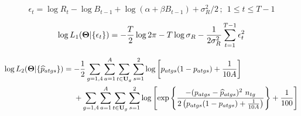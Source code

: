 \documentclass[11pt]{article}   %
\def\bfTh{{\bf \Theta}}          %
\def\beq{\vspace{-5ex} \begin{fleqn} \begin{equation}}   %
\def\eeq{\end{equation} \end{fleqn} \vspace{-5ex}}     %
\def\vsd{\vspace*{1ex}}     %
\begin{document}



 \eec \vspace{1ex}

\beq \epsilon_t = \log R_t  - \log B_{t-1} + \log(\alpha + \beta B_{t-1}) + \sigma_R^2/2 \, ; ~~ 1 \leq t \leq T-1 \label{epst} \eeq \vsd




 \eec \vspace{1ex}

\beq \log L_1(\bfTh | \{ \epsilon_t \}) =
  - \frac{T}{2} \log 2 \pi - T \log \sigma_R - \frac{1}{2 \sigma_R^2} \sum_{t=1}^{T-1} \epsilon_t^2
  \label{ll1} \eeq \vsd \vsd \vsd \vsd \vsd


\vspace{-5ex}
\begin{fleqn}
\begin{eqnarray}
\nonumber \log L_2(\bfTh | \{ \widehat{p}_{atgs} \} ) = - \frac{1}{2} \sum_{g=1,4} \sum_{a=1}^A \sum_{t \in {\bf U}_g} \sum_{s=1}^2 \log \left[ p_{atgs} ( 1 - p_{atgs} ) + \frac{1}{10 A} \right]~~~~~~~~~~~~~~~~~~~~~~ \\
 + \sum_{g=1,4} \sum_{a=1}^A \sum_{t \in {\bf U}_g} \sum_{s=1}^2 \log \left[ \exp \left\{ \frac{- ( p_{atgs} - \widehat{p}_{atgs} )^2~n_{tg}}{2 \left( p_{atgs} ( 1 - p_{atgs} ) + \frac{1}{10 A} \right) } \right\} + \frac{1}{100} \right]
\label{ll2} %
\end{eqnarray}
\end{fleqn}
\vspace{-5ex}
 \vsd \vsd
\end{document}
